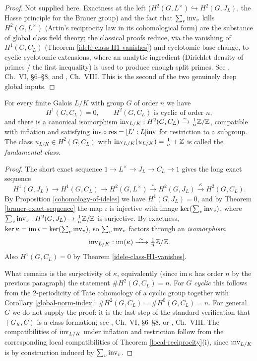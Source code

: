 \begin{proof}
Not supplied here.
Exactness at the left ($H^2(G,L^\times)\hookrightarrow H^2(G,J_L)$, the
Hasse principle for the Brauer group) and the fact that
$\sum_v{\mathrm{inv}}_v$ kills $H^2(G,L^\times)$ (Artin's reciprocity law in its
cohomological form) are the substance of global class field theory; the
classical proofs reduce, via the vanishing of $H^1(G,C_L)$
(Theorem \ref{idele-class-H1-vanishes}) and cyclotomic base change, to cyclic
cyclotomic extensions, where an analytic ingredient
(Dirichlet density of primes / the first inequality) is used to produce enough
split primes. See \cite{Neu99}, Ch.~VI, \S6--\S8, and \cite{Mil20}, Ch.~VIII.
This is the second of the two genuinely deep global inputs.
\end{proof}

\begin{thm}
\label{idele-class-formation}
For every finite Galois $L/K$ with group $G$ of order $n$ we have
$$H^1(G,C_L)=0,\qquad
H^2(G,C_L)\text{ is cyclic of order }n,$$
and there is a canonical isomorphism
${\mathrm{inv}}_{L/K}:H^2(G,C_L)\xrightarrow{\sim}\frac1n{\mathbb {Z}}/{\mathbb {Z}}$, compatible with
inflation and satisfying ${\mathrm{inv}}\circ\operatorname{res}=[L':L]{\mathrm{inv}}$ for restriction to a
subgroup.
The class $u_{L/K}\in H^2(G,C_L)$ with ${\mathrm{inv}}_{L/K}(u_{L/K})=\frac1n+{\mathbb {Z}}$ is
called the \emph{fundamental class}.
\end{thm}

\begin{proof}
The short exact sequence $1\to L^\times\to J_L\to C_L\to 1$ gives the long exact
sequence
$$H^1(G,J_L)\to H^1(G,C_L)\to H^2(G,L^\times)\xrightarrow{\ \iota\ }H^2(G,J_L)
\xrightarrow{\ \kappa\ }H^2(G,C_L).$$
By Proposition \ref{cohomology-of-ideles} we have $H^1(G,J_L)=0$, and by
Theorem \ref{brauer-exact-sequence} the map $\iota$ is injective with image
$\ker(\sum_v{\mathrm{inv}}_v)$, where $\sum_v{\mathrm{inv}}_v:H^2(G,J_L)\to\frac1n{\mathbb {Z}}/{\mathbb {Z}}$ is
surjective.
By exactness, $\ker\kappa=\mathrm{im}\,\iota=\ker(\sum_v{\mathrm{inv}}_v)$, so $\sum_v{\mathrm{inv}}_v$
factors through an \emph{isomorphism}
$$\inv_{L/K}:\mathrm{im}(\kappa)\xrightarrow{\ \sim\ }\tfrac1n\BZ/\BZ .$$
Also $H^1(G,C_L)=0$ by Theorem \ref{idele-class-H1-vanishes}.

What remains is the surjectivity of $\kappa$, equivalently (since $\mathrm{im}\,\kappa$ has
order $n$ by the previous paragraph) the statement $\#H^2(G,C_L)=n$.
For $G$ \emph{cyclic} this follows from the $2$-periodicity of Tate cohomology
of a cyclic group together with Corollary \ref{global-norm-index}:
$\#H^2(G,C_L)=\#H^0(G,C_L)=n$.
For general $G$ we do not supply the proof: it is the last step of the standard
verification that $(G_K,C)$ is a class formation; see \cite{Neu99}, Ch.~VI,
\S6--\S8, or \cite{Mil20}, Ch.~VIII.
The compatibilities of ${\mathrm{inv}}_{L/K}$ under inflation and restriction follow from
the corresponding local compatibilities of Theorem \ref{local-reciprocity}(i),
since ${\mathrm{inv}}_{L/K}$ is by construction induced by $\sum_v{\mathrm{inv}}_v$.
\end{proof}

